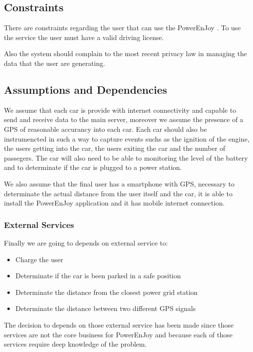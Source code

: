 \documentclass[11pt]{article} %
\newcommand{\pe}{PowerEnJoy }
\begin{document}
  \subsection{Constraints}
  
  There are constraints regarding the user that can use the \pe. To use the service the user must have a valid driving license. 
  
  Also the system should complain to the most recent privacy law in managing the data that the user are generating.
  
  \subsection{Assumptions  and  Dependencies}
  
  We assume that each car is provide with internet connectivity and capable to send and receive data to the main server, moreover we assume the presence of a GPS of reasonable accurancy into each car.
  Each car should also be instrumencted in such a way to capture events suchs as the ignition of the engine, the users getting into the car, the users exiting the car and the number of passegers.
  The car will also need to be able to monitoring the level of the battery and to determinate if the car is plugged to a power station.
  
  We also assume that the final user has a smartphone with GPS, necessary to determinate the actual distance from the user itself and the car, it is able to install the \pe application and it has mobile internet connection.
  
  	\subsubsection{External Services}
  	Finally we are going to depends on external service to:
  	\begin{itemize}
  		\item Charge the user
  		\item Determinate if the car is been parked in a safe position
  		\item Determinate the distance from the closest power grid station
  		\item Determinate the distance between two different GPS signals
  	\end{itemize}
  	
  	The decision to depends on those external service has been made since those services are not the core business for \pe and because each of those services require deep knowledge of the problem.
\end{document}
